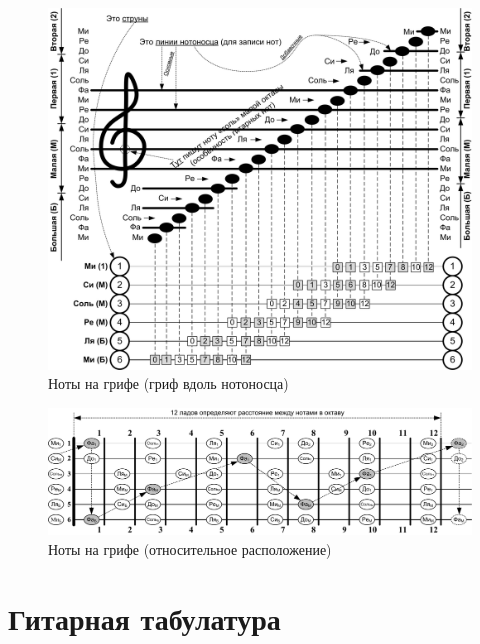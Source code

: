 \begin{figure}[!ht]
    \centering
    \includegraphics[width=\textwidth]{fig/lad-by-griph} 
    \caption{Ноты на грифе (гриф вдоль нотоносца)}\label{fig:ladByGriph}
\end{figure} 

\begin{figure}[!ht]
    \centering
    \includegraphics[width=\textwidth]{fig/notes-on-griph} 
    \caption{Ноты на грифе (относительное расположение)}\label{fig:notesOnGriph}
\end{figure} 


\section{Гитарная табулатура}


